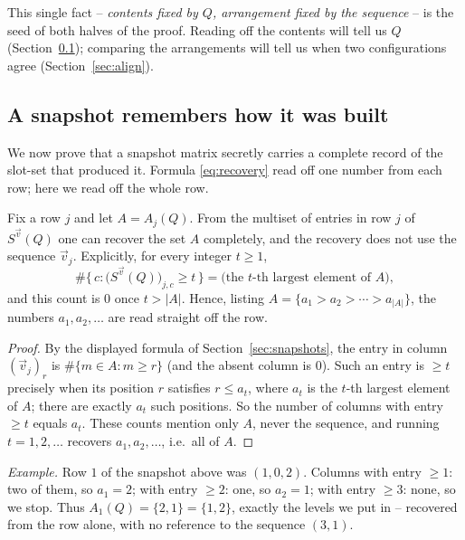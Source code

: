This single fact -- \emph{contents fixed by $Q$, arrangement fixed by the
sequence} -- is the seed of both halves of the proof.  Reading off the contents
will tell us $Q$ (Section~\ref{sec:remember}); comparing the arrangements will tell
us when two configurations agree (Section~\ref{sec:align}).


\subsection{A snapshot remembers how it was built}
\label{sec:remember}

We now prove that a snapshot matrix secretly carries a complete record of the
slot-set that produced it.  Formula \eqref{eq:recovery} read off one number from
each row; here we read off the whole row.

\begin{lemma}\label{lem:recover}
Fix a row $j$ and let $A=A_j(Q)$.  From the multiset of entries in row $j$ of
$S^{\vec v}(Q)$ one can recover the set $A$ completely, and the recovery does not
use the sequence $\vec v_j$.  Explicitly, for every integer $t\ge1$,
\[
\#\{\,c:\bigl(S^{\vec v}(Q)\bigr)_{j,c}\ge t\,\}
=
\bigl(\text{the $t$-th largest element of }A\bigr),
\]
and this count is $0$ once $t>|A|$.  Hence, listing $A=\{a_1>a_2>\cdots>a_{|A|}\}$,
the numbers $a_1,a_2,\ldots$ are read straight off the row.
\end{lemma}

\begin{proof}
By the displayed formula of Section~\ref{sec:snapshots}, the entry in column
$(\vec v_j)_r$ is $\#\{m\in A:m\ge r\}$ (and the absent column is $0$).  Such
an entry is $\ge t$ precisely when its position $r$ satisfies $r\le a_t$, where $a_t$
is the $t$-th largest element of $A$; there are exactly $a_t$ such positions.  So the
number of columns with entry $\ge t$ equals $a_t$.  These counts mention only $A$,
never the sequence, and running $t=1,2,\ldots$ recovers $a_1,a_2,\ldots$, i.e.\ all
of $A$.
\end{proof}

\noindent\textit{Example.}  Row $1$ of the snapshot above was $(1,0,2)$.  Columns
with entry $\ge1$: two of them, so $a_1=2$; with entry $\ge2$: one, so $a_2=1$;
with entry $\ge3$: none, so we stop.  Thus $A_1(Q)=\{2,1\}=\{1,2\}$, exactly the
levels we put in -- recovered from the row alone, with no reference to the sequence
$(3,1)$.

